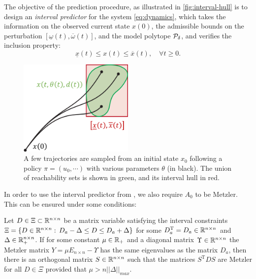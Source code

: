 \documentclass{article}
\begin{document}
The objective of the prediction procedure, as illustrated in \autoref{fig:interval-hull} is to design an \emph{interval predictor} for the system \eqref{eq:dynamics}, which takes the information on the observed current state ${x}({0})$, the admissible bounds on the perturbation $[\underline{\omega}(t),\overline{\omega}(t)]$, and the model polytope $\mathcal{P}_\delta$, and verifies the inclusion property:
\begin{equation}
\label{eq:interval_property}
\underline{x}(t)\leq x(t)\leq\overline{x}(t),\quad\forall t\geq0.
\end{equation}

\begin{figure}
    \centering
    \includegraphics[width=0.5\textwidth]{img/interval-hull}
    \caption{A few trajectories are sampled from an initial state $x_0$ following a policy $\pi=(u_0,\cdots)$ with various parameters $\theta$ (in black). The union of reachability sets is shown in green, and its interval hull in red.}
    \label{fig:interval-hull}
\end{figure}

In order to use the interval predictor from \citep{leurent2019interval}, we also require $A_0$ to be Metzler. This can be ensured under some conditions:

\begin{lemma}
\label{lem:metzler} Let $D\in\Xi\subset\mathbb{R}^{n\times n}$ be a matrix variable satisfying the interval constraints $\Xi=\{D\in\mathbb{R}^{n\times n}:\,D_{a}-\Delta\le D\le D_{a}+\Delta\}$ for some $D_{a}^{\text{T}}=D_{a}\in\mathbb{R}^{n\times n}$ and $\Delta\in\mathbb{R}_{+}^{n\times n}$. If for some constant $\mu\in\mathbb{R}_{+}$ and a diagonal matrix $\Upsilon\in\mathbb{R}^{n\times n}$ the Metzler matrix $Y=\mu E_{n\times n}-\Upsilon$ has the same eigenvalues as the matrix $D_{a}$, then there is an orthogonal matrix $S\in\mathbb{R}^{n\times n}$ such that the matrices $S^{\text{T}}DS$ are Metzler for all $D\in\Xi$ provided that $\mu>n||\Delta||_{max}$.\textup{ }
\end{lemma}
\end{document}
